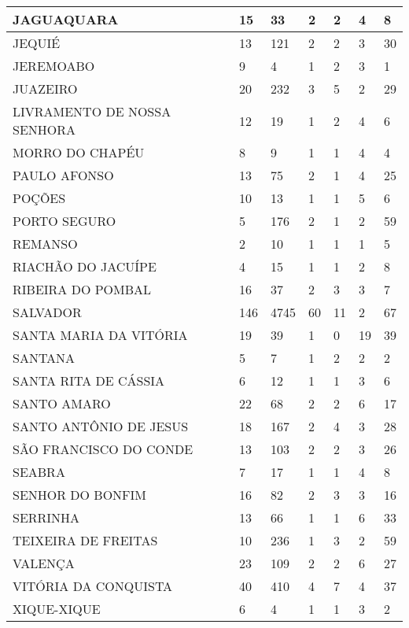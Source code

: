 \documentclass[a4paper]{article}
\begin{document}
{\begin{longtable}{|p{2.87cm}|p{1.38cm}|p{1.49cm}|p{1.02cm}|p{1.03cm}|p{1.7cm}|p{1.59cm}|}
   \hline
JAGUAQUARA & 15 & 33 & 2 & 2 & 4 & 8 \\ 
   \hline
JEQUIÉ & 13 & 121 & 2 & 2 & 3 & 30 \\ 
   \hline
JEREMOABO & 9 & 4 & 1 & 2 & 3 & 1 \\ 
   \hline
JUAZEIRO & 20 & 232 & 3 & 5 & 2 & 29 \\ 
   \hline
LIVRAMENTO DE NOSSA SENHORA & 12 & 19 & 1 & 2 & 4 & 6 \\ 
   \hline
MORRO DO CHAPÉU & 8 & 9 & 1 & 1 & 4 & 4 \\ 
   \hline
PAULO AFONSO & 13 & 75 & 2 & 1 & 4 & 25 \\ 
   \hline
POÇÕES & 10 & 13 & 1 & 1 & 5 & 6 \\ 
   \hline
PORTO SEGURO & 5 & 176 & 2 & 1 & 2 & 59 \\ 
   \hline
REMANSO & 2 & 10 & 1 & 1 & 1 & 5 \\ 
   \hline
RIACHÃO DO JACUÍPE & 4 & 15 & 1 & 1 & 2 & 8 \\ 
   \hline
RIBEIRA DO POMBAL & 16 & 37 & 2 & 3 & 3 & 7 \\ 
   \hline
SALVADOR & 146 & 4745 & 60 & 11 & 2 & 67 \\ 
   \hline
SANTA MARIA DA VITÓRIA & 19 & 39 & 1 & 0 & 19 & 39 \\ 
   \hline
SANTANA & 5 & 7 & 1 & 2 & 2 & 2 \\ 
   \hline
SANTA RITA DE CÁSSIA & 6 & 12 & 1 & 1 & 3 & 6 \\ 
   \hline
SANTO AMARO & 22 & 68 & 2 & 2 & 6 & 17 \\ 
   \hline
SANTO ANTÔNIO DE JESUS & 18 & 167 & 2 & 4 & 3 & 28 \\ 
   \hline
SÃO FRANCISCO DO CONDE & 13 & 103 & 2 & 2 & 3 & 26 \\ 
   \hline
SEABRA & 7 & 17 & 1 & 1 & 4 & 8 \\ 
   \hline
SENHOR DO BONFIM & 16 & 82 & 2 & 3 & 3 & 16 \\ 
   \hline
SERRINHA & 13 & 66 & 1 & 1 & 6 & 33 \\ 
   \hline
TEIXEIRA DE FREITAS & 10 & 236 & 1 & 3 & 2 & 59 \\ 
   \hline
VALENÇA & 23 & 109 & 2 & 2 & 6 & 27 \\ 
   \hline
VITÓRIA DA CONQUISTA & 40 & 410 & 4 & 7 & 4 & 37 \\ 
   \hline
XIQUE-XIQUE & 6 & 4 & 1 & 1 & 3 & 2 \\ 
   \hline
\hline
\end{longtable}
}
\end{document}
